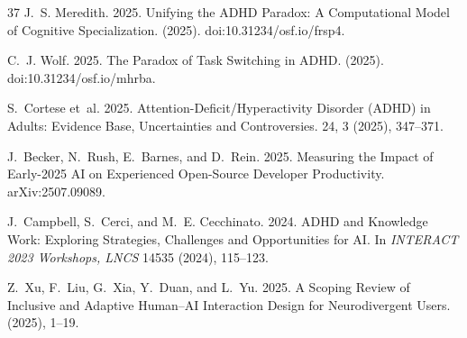 \documentclass[sigconf,nonacm]{acmart}
\begin{document}
\begin{thebibliography}{37}
J.~S. Meredith. 2025.
\newblock Unifying the ADHD Paradox: A Computational Model of Cognitive Specialization.
 (2025). doi:10.31234/osf.io/frsp4.

C.~J. Wolf. 2025.
\newblock The Paradox of Task Switching in ADHD.
 (2025). doi:10.31234/osf.io/mhrba.

S.~Cortese et~al. 2025.
\newblock Attention-Deficit/Hyperactivity Disorder (ADHD) in Adults: Evidence Base, Uncertainties and Controversies.
 24, 3 (2025), 347--371.

J.~Becker, N.~Rush, E.~Barnes, and D.~Rein. 2025.
\newblock Measuring the Impact of Early-2025 AI on Experienced Open-Source Developer Productivity.
 arXiv:2507.09089.

J.~Campbell, S.~Cerci, and M.~E. Cecchinato. 2024.
\newblock ADHD and Knowledge Work: Exploring Strategies, Challenges and Opportunities for AI.
\newblock In {\em INTERACT 2023 Workshops, LNCS} 14535 (2024), 115--123.

Z.~Xu, F.~Liu, G.~Xia, Y.~Duan, and L.~Yu. 2025.
\newblock A Scoping Review of Inclusive and Adaptive Human--AI Interaction Design for Neurodivergent Users.
 (2025), 1--19.

\end{thebibliography}
\end{document}
